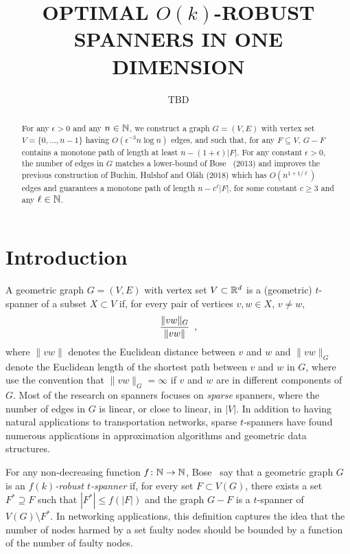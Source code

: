 \documentclass{patmorin}
\title{\MakeUppercase{Optimal} $O(k)$-\MakeUppercase{Robust Spanners in One Dimension}}
\author{TBD}
\begin{document}
\maketitle


\begin{abstract}
  For any $\epsilon >0$ and any $n\in\mathbb{N}$, we construct a graph $G=(V,E)$
  with vertex set $V=\{0,\ldots,n-1\}$ having $O(\epsilon^{-3}n\log n)$
  edges, and such that, for any $F\subseteq V$, $G-F$ contains a monotone
  path of length at least $n-(1+\epsilon)|F|$.  For any constant $\epsilon
  >0$, the number of edges in $G$ matches a lower-bound of Bose \etal\
  (2013) and improves the previous construction of Buchin, Hulshof and
  Ol\'ah (2018) which has $O(n^{1+1/\ell})$ edges and guarantees a
  monotone path of length $n- c^{\ell}|F|$, for some constant
  $c\ge 3$ and any $\ell\in\mathbb{N}$.
\end{abstract}

\section{Introduction}

A geometric graph $G=(V,E)$ with vertex set $V\subset\mathbb{R}^d$ is a (geometric)
$t$-spanner of a subset $X\subset V$ if, for every pair of vertices
$v,w\in X$, $v\neq w$,
\begin{equation}
  \frac{\|vw\|_G}{\|vw\|} \enspace , \eqlabel{spanning-ratio}
\end{equation}
where $\|vw\|$ denotes the Euclidean distance between $v$ and $w$ and
$\|vw\|_G$ denote the Euclidean length of the shortest path between $v$
and $w$ in $G$, where use the convention that $\|vw\|_G=\infty$ if $v$
and $w$ are in different components of $G$.  
Most of the research on spanners focuses on \emph{sparse}
spanners, where the number of edges in $G$ is linear, or close to linear,
in $|V|$.  In addition to having natural applications to transportation
networks, sparse $t$-spanners have found numerous applications in
approximation algorithms and geometric data structures.

For any non-decreasing function $f\colon\mathbb{N}\to\mathbb{N}$, Bose \etal\ say
that a geometric graph $G$ is an \emph{$f(k)$-robust $t$-spanner}
if, for every set $F\subset V(G)$, there exists a set $F^*\supseteq
F$ such that $|F^*|\le f(|F|)$ and the graph $G-F$ is a $t$-spanner
of $V(G)\setminus F^*$.  In networking applications, this definition
captures the idea that the number of nodes harmed by a set faulty nodes
should be bounded by a function of the number of faulty nodes.
\end{document}
